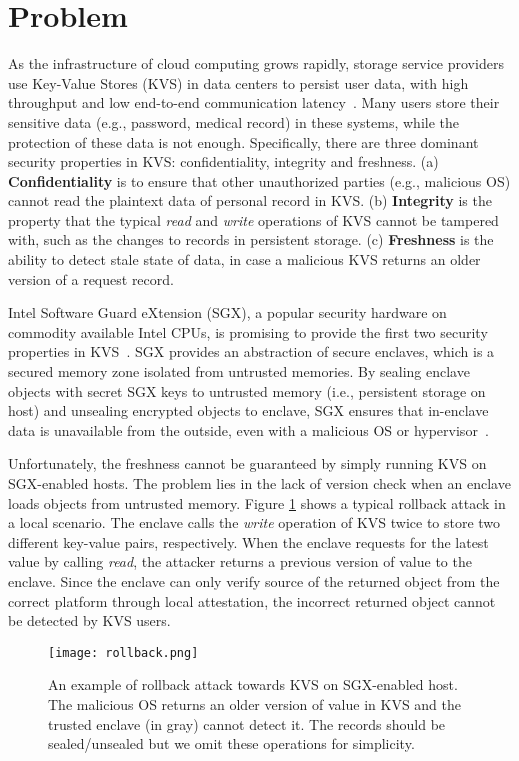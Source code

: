 \section{Problem}\label{problem}

As the infrastructure of cloud computing grows rapidly, storage service providers use Key-Value Stores (KVS) 
in data centers to persist user data, with high throughput and low end-to-end communication latency~\cite{}.
Many users store their sensitive data (e.g., password, medical record) in these systems, while the protection 
of these data is not enough. 
Specifically, there are three dominant security properties in KVS: confidentiality, integrity and freshness.
(a) \textbf{Confidentiality} is to ensure that other unauthorized parties (e.g., malicious OS) cannot read the plaintext 
data of personal record in KVS. (b) \textbf{Integrity} is the property that the typical \textit{read} and \textit{write} 
operations of KVS cannot be tampered with, such as the changes to records in persistent storage. (c) \textbf{Freshness}
is the ability to detect stale state of data, in case a malicious KVS returns an older version of a request record.

Intel Software Guard eXtension (SGX), a popular security hardware on commodity available Intel CPUs, is promising 
to provide the first two security properties in KVS~\cite{}. SGX provides an abstraction of secure enclaves, which is a secured 
memory zone isolated from untrusted memories. By sealing enclave objects with secret SGX keys to untrusted memory (i.e., 
persistent storage on host) and unsealing encrypted objects to enclave, SGX ensures that in-enclave data is unavailable 
from the outside, even with a malicious OS or hypervisor~\cite{}.

Unfortunately, the freshness cannot be guaranteed by simply running KVS on SGX-enabled hosts. 
The problem lies in the lack of version check when an enclave loads objects from untrusted memory.
Figure \ref{fig:rollback} shows a typical rollback attack in a local scenario. The enclave calls the \textit{write} 
operation of KVS twice to store two different key-value pairs, respectively. When the enclave
requests for the latest value by calling \textit{read}, the attacker returns a previous version of value 
to the enclave. Since the enclave can only verify source of the returned object from the correct platform
through local attestation, the incorrect returned object cannot be detected by KVS users.

\begin{figure}
    \centering
        \texttt{[image: rollback.png]}
        \caption[title]{An example of rollback attack towards KVS on SGX-enabled host. 
        The malicious OS returns an older version of value in KVS and the trusted enclave (in gray)
        cannot detect it. The records should be sealed/unsealed but we omit these operations for simplicity.}
        \label{fig:rollback}
\end{figure}

